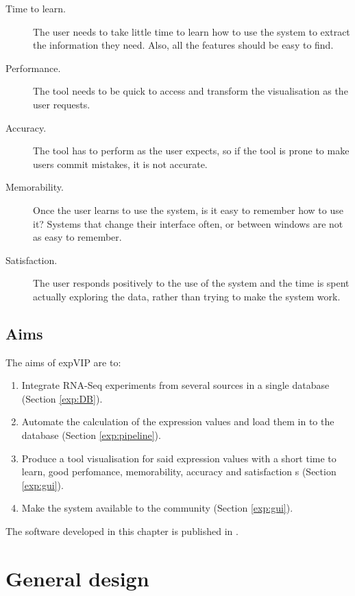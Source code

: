 \begin{description}
\item[Time to learn.] The user needs to take little time to learn how to use the system to extract the information they need. Also, all the features should be easy to find.
\item[Performance.] The tool needs to be quick to access and transform the visualisation as the user requests.
\item[Accuracy.] The tool has to perform as the user expects, so if the tool is prone to make users commit mistakes, it is not accurate. 
\item[Memorability.] Once the user learns to use the system, is it easy to remember how to use it? Systems that change their interface often, or between windows are not as easy to remember. 
\item[Satisfaction.] The user responds positively to the use of the system and the time is spent actually exploring the data, rather than trying to make the system work. 
\end{description}

\subsection{Aims}
\label{exp:aims}
The aims of expVIP are to:
\begin{enumerate}
\item Integrate RNA-Seq experiments from several sources in a single database (Section \ref{exp:DB}). 
\item Automate the calculation of the expression values and load them in to the database (Section \ref{exp:pipeline}).
\item Produce a tool  visualisation for said expression values with a short time to learn, good perfomance, memorability, accuracy and satisfaction s (Section \ref{exp:gui}).
\item Make the system available to the community (Section \ref{exp:gui}).
\end{enumerate}

The software developed in this chapter is published in \cite*{Borrill2016}. 

\section{General design}

